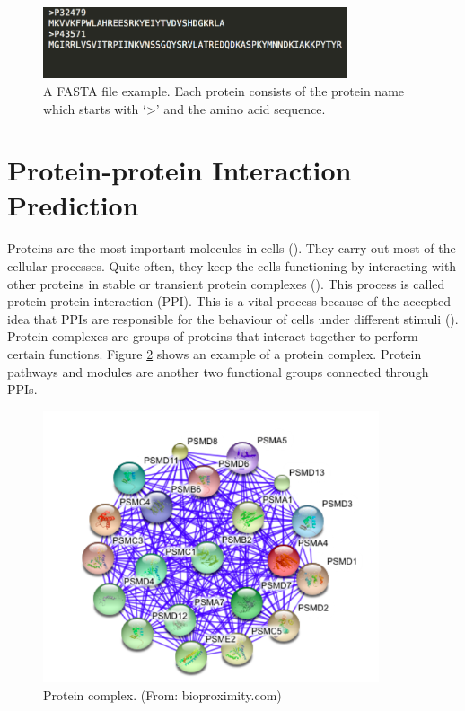 \begin{figure}
\begin{center}
\includegraphics[width=0.8\textwidth]{img/fasta.png}
\caption[A FASTA file example]{A FASTA file example. Each protein consists of the protein name which starts with `\textgreater' and the amino acid sequence.}
\label{fig:fasta}  
\end{center}
\end{figure}

\section{Protein-protein Interaction Prediction \label{PPI_site_intro}}
Proteins are the most important molecules in cells (\cite{schleif1993genetics}). 
They carry out most of the cellular processes. Quite often, they keep the cells functioning by interacting with other proteins in stable or transient protein complexes (\cite{eisenberg2000protein}).
This process is called protein-protein interaction (PPI). This is a vital process because of the accepted idea that PPIs are responsible for the behaviour of cells under different stimuli (\cite{bader2003functional, pandey2000proteomics, schwikowski2000network}).
Protein complexes are groups of proteins that interact together to perform certain functions. Figure \ref{fig_pro_comp} shows an example of a protein complex. Protein pathways and modules are another two functional groups connected through PPIs. 
\begin{figure}[h!]
\begin{center}
\includegraphics[height = 8cm]{img/pro_comp.png}
\caption[Protein complex]{Protein complex. (From: bioproximity.com)  \label{fig_pro_comp}}
\end{center}
\end{figure}
